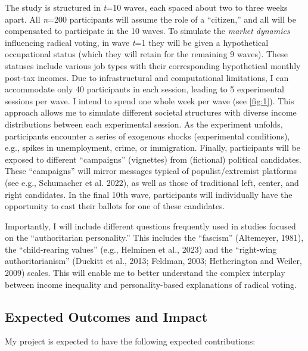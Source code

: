 \documentclass[letterpaper]{article}
\begin{document}
\vspace{2mm}The study is structured in \emph{t}=10 waves, each spaced about two to three weeks apart. All \emph{n}=200 participants will assume the role of a ``citizen,'' and all will be compensated to participate in the 10 waves. To simulate the \emph{market dynamics} influencing radical voting, in wave \emph{t}=1 they will be given a hypothetical occupational status (which they will retain for the remaining 9 waves). These statuses include various job types with their corresponding hypothetical monthly post-tax incomes. Due to infrastructural and computational limitations, I can accommodate only 40 participants in each session, leading to 5 experimental sessions per wave. I intend to spend one whole week per wave (see \autoref{fig:1}). This approach allows me to simulate different societal structures with diverse income distributions between each experimental session.  As the experiment unfolds, participants encounter a series of exogenous shocks (experimental conditions), e.g., spikes in unemployment, crime, or immigration. Finally, participants will be exposed to different ``campaigns'' (vignettes) from (fictional) political candidates. These ``campaigns'' will mirror messages typical of populist/extremist platforms (see e.g., Schumacher et al. 2022), as well as those of traditional left, center, and right candidates. In the final 10th wave, participants will individually have the opportunity to cast their ballots for one of these candidates. 

\vspace{2mm}Importantly, I will include different questions frequently used in studies focused on the ``authoritarian personality.'' This includes the ``fascism'' (Altemeyer, 1981), the ``child-rearing values'' (e.g., Helminen et al., 2023) and the ``right-wing authoritarianism'' (Duckitt et al., 2013; Feldman, 2003; Hetherington and Weiler, 2009) scales. This will enable me to better understand the complex interplay between income inequality and personality-based explanations of radical voting. 

\subsection*{Expected Outcomes and Impact}

My project is expected to have the following expected contributions:
\end{document}
